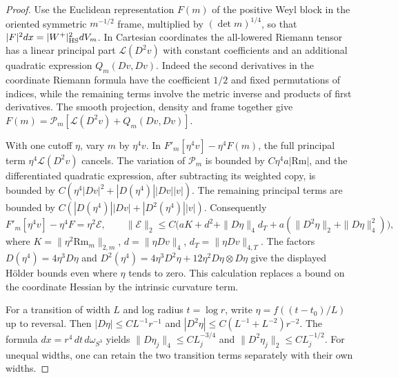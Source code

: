 \documentclass[11pt]{article}
\theoremstyle{remark}
\newcommand{\Rm}{\mathrm{Rm}}
\begin{document}
\begin{proof}
Use the Euclidean representation \(F(m)\) of the positive Weyl block in the oriented symmetric \(m^{-1/2}\) frame, multiplied by \((\det m)^{1/4}\), so that \(|F|^2dx=|W^+|_{\rm HS}^2dV_m\). In Cartesian coordinates the all-lowered Riemann tensor has a linear principal part \(\mathcal L(D^2v)\) with constant coefficients and an additional quadratic expression \(Q_m(Dv,Dv)\). Indeed the second derivatives in the coordinate Riemann formula have the coefficient \(1/2\) and fixed permutations of indices, while the remaining terms involve the metric inverse and products of first derivatives. The smooth projection, density and frame together give \(F(m)=\mathcal P_m[\mathcal L(D^2 v)+Q_m(Dv,Dv)]\).

With one cutoff \(\eta\), vary \(m\) by \(\eta^4v\). In \(F'_m[\eta^4v]-\eta^4F(m)\), the full principal term \(\eta^4\mathcal L(D^2v)\) cancels. The variation of \(\mathcal P_m\) is bounded by \(C\eta^4 a|\Rm|\), and the differentiated quadratic expression, after subtracting its weighted copy, is bounded by \(C(\eta^4|Dv|^2+|D(\eta^4)||Dv||v|)\). The remaining principal terms are bounded by \(C(|D(\eta^4)||Dv|+|D^2(\eta^4)||v|)\). Consequently
\begin{equation}
 F'_m[\eta^4v]-\eta^4F=\eta^2\mathcal E,\qquad
 \|\mathcal E\|_2\le C\bigl(aK+d^2+\|D\eta\|_4d_T
             +a(\|D^2\eta\|_2+\|D\eta\|_4^2)\bigr),
 \label{eq:chartdef}
\end{equation}
where \(K=\|\eta^2\Rm_m\|_{2,m}\), \(d=\|\eta Dv\|_4\), \(d_T=\|\eta Dv\|_{4,T}\). The factors \(D(\eta^4)=4\eta^3D\eta\) and \(D^2(\eta^4)=4\eta^3D^2\eta+12\eta^2D\eta\otimes D\eta\) give the displayed Hölder bounds even where \(\eta\) tends to zero. This calculation replaces a bound on the coordinate Hessian by the intrinsic curvature term.

For a transition of width \(L\) and log radius \(t=\log r\), write \(\eta=f((t-t_0)/L)\) up to reversal. Then \(|D\eta|\le CL^{-1}r^{-1}\) and \(|D^2\eta|\le C(L^{-1}+L^{-2})r^{-2}\). The formula \(dx=r^4\,dt\,d\omega_{S^3}\) yields \(\|D\eta_j\|_4\le CL_j^{-3/4}\) and \(\|D^2\eta_j\|_2\le CL_j^{-1/2}\). For unequal widths, one can retain the two transition terms separately with their own widths.


\end{proof}
\end{document}
